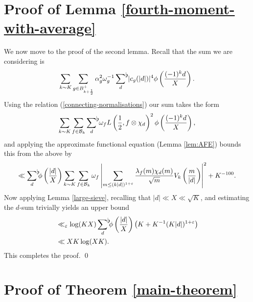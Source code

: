 \documentclass[a4paper,10pt,twoside]{amsart}
\theoremstyle{definition}
\numberwithin{equation}{section}
\newcommand\eps{\varepsilon}
\renewcommand\:{\colon}
\newcommand{\sumflat}{\mathop{{\sum}^{\raisebox{-3pt}{\makebox[0pt][l]{$\flat$}}}}}
\begin{document}
\section{Proof of Lemma \ref{fourth-moment-with-average}}

\noindent We now move to the proof of the second lemma. Recall that the sum we are considering is
\[
\sum_{k\sim K}\sum_{g\in B^+_{k+\frac12}}\alpha_g^2\omega_g^{-1}\sumflat_{d}\, |c_g(|d|)|^4\phi\left(\frac{(-1)^k d}X\right).
\]
Using the relation (\ref{connecting-normalisations}) our sum takes the form
\[\sum_{k\sim K}\sum_{f\in\mathcal B_k}\sumflat_{d}\,\omega_f L\left(\frac12,f\otimes\chi_{d}\right)^2\phi\left(\frac {(-1)^kd}X\right), \] 
and applying the approximate functional equation (Lemma \ref{lem:AFE}) bounds this from the above by 
\begin{align*}
\ll \sumflat_d\phi\left(\frac{|d|}X\right)\sum_{k\sim K}\sum_{f\in\mathcal B_k}\omega_f\left|\sum_{m\leq (k|d|)^{1+\varepsilon}}\frac{\lambda_f(m)\chi_d(m)}{\sqrt m}V_k\left(\frac m{|d|}\right)\right|^2+K^{-100}.
\end{align*}
Now applying Lemma \ref{large-sieve}, recalling that $|d|\ll X\ll\sqrt K$, and estimating the $d$-sum trivially yields an upper bound
\begin{align*} 
&\ll_\varepsilon\log (KX)\sumflat_d\phi\left(\frac{|d|}X\right)\left(K+K^{-1}(K|d|)^{1+\eps}\right) \\
& \ll XK\log (XK). 
\end{align*}
This completes the proof. \qed
 
\section{Proof of Theorem \ref{main-theorem}}
\end{document}
